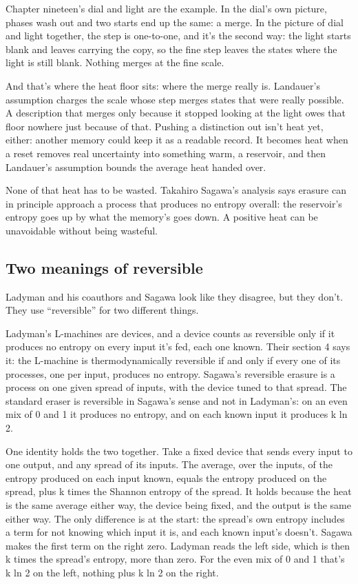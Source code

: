 \documentclass[11pt,twoside]{article}
\theoremstyle{thielethm}
\theoremstyle{thieledef}
\theoremstyle{thieledef}
\theoremstyle{thieledef}
\theoremstyle{thielethm}
\theoremstyle{thieleobs}
\theoremstyle{thielethm}
\begin{document}
Chapter nineteen's dial and light are the example. In the dial's own picture, phases wash out and two starts end up the same: a merge. In the picture of dial and light together, the step is one-to-one, and it's the second way: the light starts blank and leaves carrying the copy, so the fine step leaves the states where the light is still blank. Nothing merges at the fine scale.

And that's where the heat floor sits: where the merge really is. Landauer's assumption charges the scale whose step merges states that were really possible. A description that merges only because it stopped looking at the light owes that floor nowhere just because of that. Pushing a distinction out isn't heat yet, either: another memory could keep it as a readable record. It becomes heat when a reset removes real uncertainty into something warm, a reservoir, and then Landauer's assumption bounds the average heat handed over.

None of that heat has to be wasted. Takahiro Sagawa's analysis says erasure can in principle approach a process that produces no entropy overall: the reservoir's entropy goes up by what the memory's goes down. A positive heat can be unavoidable without being wasteful.

\subsection{Two meanings of reversible}

Ladyman and his coauthors and Sagawa look like they disagree, but they don't. They use ``reversible'' for two different things.

Ladyman's L-machines are devices, and a device counts as reversible only if it produces no entropy on every input it's fed, each one known. Their section 4 says it: the L-machine is thermodynamically reversible if and only if every one of its processes, one per input, produces no entropy. Sagawa's reversible erasure is a process on one given spread of inputs, with the device tuned to that spread. The standard eraser is reversible in Sagawa's sense and not in Ladyman's: on an even mix of 0 and 1 it produces no entropy, and on each known input it produces k ln 2.

One identity holds the two together. Take a fixed device that sends every input to one output, and any spread of its inputs. The average, over the inputs, of the entropy produced on each input known, equals the entropy produced on the spread, plus k times the Shannon entropy of the spread. It holds because the heat is the same average either way, the device being fixed, and the output is the same either way. The only difference is at the start: the spread's own entropy includes a term for not knowing which input it is, and each known input's doesn't. Sagawa makes the first term on the right zero. Ladyman reads the left side, which is then k times the spread's entropy, more than zero. For the even mix of 0 and 1 that's k ln 2 on the left, nothing plus k ln 2 on the right.
\end{document}
